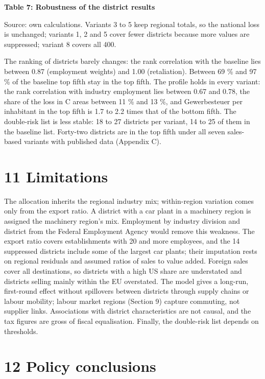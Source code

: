 \documentclass[
  11pt,
]{article}
\begin{document}
\textbf{Table 7: Robustness of the district results}



Source: own calculations. Variants 3 to 5 keep regional totals, so the
national loss is unchanged; variants 1, 2 and 5 cover fewer districts
because more values are suppressed; variant 8 covers all 400.

The ranking of districts barely changes: the rank correlation with the
baseline lies between 0.87 (employment weights) and 1.00 (retaliation).
Between 69 \% and 97 \% of the baseline top fifth stay in the top fifth.
The profile holds in every variant: the rank correlation with industry
employment lies between 0.67 and 0.78, the share of the loss in C areas
between 11 \% and 13 \%, and Gewerbesteuer per inhabitant in the top
fifth is 1.7 to 2.2 times that of the bottom fifth. The double-risk list
is less stable: 18 to 27 districts per variant, 14 to 25 of them in the
baseline list. Forty-two districts are in the top fifth under all seven
sales-based variants with published data (Appendix C).

\hypertarget{limitations}{%
\section{11 Limitations}\label{limitations}}

The allocation inherits the regional industry mix; within-region
variation comes only from the export ratio. A district with a car plant
in a machinery region is assigned the machinery region's mix. Employment
by industry division and district from the Federal Employment Agency
would remove this weakness. The export ratio covers establishments with
20 and more employees, and the 14 suppressed districts include some of
the largest car plants; their imputation rests on regional residuals and
assumed ratios of sales to value added. Foreign sales cover all
destinations, so districts with a high US share are understated and
districts selling mainly within the EU overstated. The model gives a
long-run, first-round effect without spillovers between districts
through supply chains or labour mobility; labour market regions (Section
9) capture commuting, not supplier links. Associations with district
characteristics are not causal, and the tax figures are gross of fiscal
equalisation. Finally, the double-risk list depends on thresholds.

\hypertarget{policy-conclusions}{%
\section{12 Policy conclusions}\label{policy-conclusions}}
\end{document}
